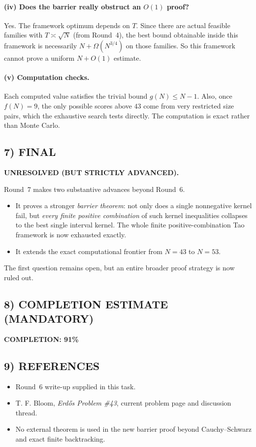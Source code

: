 \paragraph{(iv) Does the barrier really obstruct an $O(1)$ proof?}
Yes.  The framework optimum depends on $T$.  Since there are actual feasible families with $T\asymp \sqrt N$ (from Round~4), the best bound obtainable inside this framework is necessarily $N+\Omega(N^{3/4})$ on those families.  So this framework cannot prove a uniform $N+O(1)$ estimate.

\paragraph{(v) Computation checks.}
Each computed value satisfies the trivial bound $g(N)\le N-1$.  Also, once $f(N)=9$, the only possible scores above $43$ come from very restricted size pairs, which the exhaustive search tests directly.  The computation is exact rather than Monte Carlo.

\subsection{7) FINAL}

\textbf{UNRESOLVED (BUT STRICTLY ADVANCED).}

Round~7 makes two substantive advances beyond Round~6.
\begin{itemize}
\item It proves a stronger \emph{barrier theorem}: not only does a single nonnegative kernel fail, but \emph{every finite positive combination} of such kernel inequalities collapses to the best single interval kernel.  The whole finite positive-combination Tao framework is now exhausted exactly.
\item It extends the exact computational frontier from $N=43$ to $N=53$.
\end{itemize}

The first question remains open, but an entire broader proof strategy is now ruled out.

\subsection{8) COMPLETION ESTIMATE (MANDATORY)}

\textbf{COMPLETION: 91\%}

\subsection{9) REFERENCES}

\begin{itemize}
\item Round~6 write-up supplied in this task.
\item T. F. Bloom, \emph{Erd\H{o}s Problem \#43}, current problem page and discussion thread.
\item No external theorem is used in the new barrier proof beyond Cauchy--Schwarz and exact finite backtracking.
\end{itemize}
